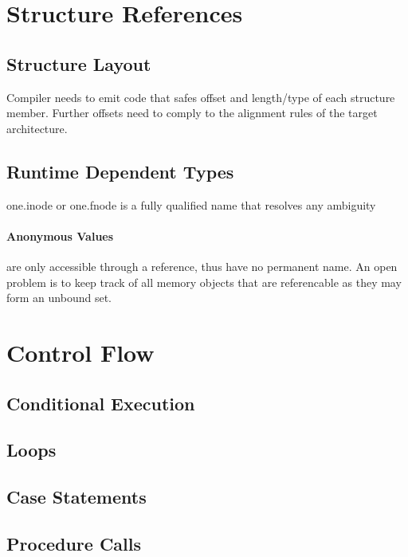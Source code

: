 \section{Structure References}
\subsection{Structure Layout}
Compiler needs to emit code that safes offset and length/type of each structure member. Further offsets need to comply to the alignment rules of the target architecture.
\subsection{Runtime Dependent Types}
one.inode or one.fnode is a fully qualified name that resolves any ambiguity

\paragraph{Anonymous Values} are only accessible through a reference, thus have no permanent name. An open problem is to keep track of all memory objects that are referencable as they may form an unbound set.

\section{Control Flow}
\subsection{Conditional Execution}

\subsection{Loops}

\subsection{Case Statements}
\subsection{Procedure Calls}
